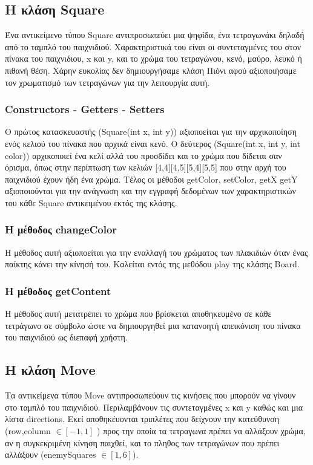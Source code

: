 \documentclass[12pt]{article}
\begin{document}
    \subsection{Η κλάση Square}
    Ένα αντικείμενο τύπου Square αντιπροσωπεύει μια ψηφίδα, ένα τετραγωνάκι δηλαδή από το ταμπλό του παιχνιδιού. Χαρακτηριστικά του είναι οι συντεταγμένες του στον πίνακα του παιχνιδιου, x και y, και το χρώμα του τετραγώνου, κενό, μαύρο, λευκό ή πιθανή θέση. Χάρην ευκολίας δεν δημιουργήσαμε κλάση Πιόνι αφού αξιοποιήσαμε τον χρωματισμό των τετραγώνων για την λειτουργία αυτή. 
        \subsubsection{Constructors - Getters - Setters}
        Ο πρώτος κατασκευαστής (Square(int x, int y)) αξιοποείται για την αρχικοποίηση ενός κελιού του πίνακα που αρχικά είναι κενό. Ο δεύτερος (Square(int x, int y, int color)) αρχικοποιεί ένα κελί αλλά του προσδίδει και το χρώμα που δίδεται σαν όρισμα, όπως στην περίπτωση των κελιών [4,4][4,5][5,4][5,5] που στην αρχή του παιχνιδιού έχουν ήδη ένα χρώμα. Τέλος οι μέθοδοι getColor, setColor, getX getY αξιοποιούνται για την ανάγνωση και την εγγραφή δεδομένων των χαρακτηριστικών του κάθε Square αντικειμένου εκτός της κλάσης.
        \subsubsection{Η μέθοδος changeColor}
        Η μέθοδος αυτή αξιοποείται για την εναλλαγή του χρώματος των πλακιδιών όταν ένας παίκτης κάνει την κίνησή του. Καλείται εντός της μεθόδου play της κλάσης Board.
        \subsubsection{Η μέθοδος getContent}
        Η μέθοδος αυτή μετατρέπει το χρώμα που βρίσκεται αποθηκευμένο σε κάθε τετράγωνο σε σύμβολο ώστε να δημιουργηθεί μια κατανοητή απεικόνιση του πίνακα του παιχνιδιού ως διεπαφή χρήστη. 
    \subsection{Η κλάση Move}
    Τα αντικείμενα τύπου Move αντιπροσωπεύουν τις κινήσεις που μπορούν να γίνουν στο ταμπλό του παιχνιδιού. Περιλαμβάνουν τις συντεταγμένες x και y καθώς και μια λίστα directions. Εκεί αποθηκέυονται τριπλέτες που δείχνουν την κατεύθυνση (row,column $\in [-1,1]$ ) προς την οποία τα τετραγωνα πρέπει να αλλάξουν χρώμα, αν η συγκεκριμένη κίνηση παιχθεί, και το πληθος των τετραγώνων που πρέπει αλλάξουν (enemySquares $\in [1,6]$). 
\end{document}
